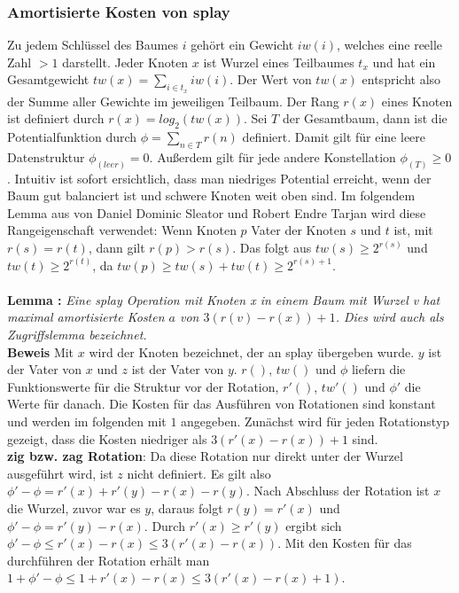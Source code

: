 \documentclass[11pt, a4paper]{article}
\begin{document}
\subsubsection{Amortisierte Kosten von splay }
Zu jedem Schlüssel des Baumes $i$ gehört ein Gewicht $iw(i)$, welches eine reelle Zahl $>1$ darstellt. Jeder Knoten $x$ ist Wurzel eines Teilbaumes $t_x$ und hat ein Gesamtgewicht $tw(x) = \sum \limits_{i \in t_x} iw(i)$. Der Wert von $tw(x)$ entspricht also der Summe aller Gewichte im jeweiligen Teilbaum. Der Rang $r(x)$ eines Knoten ist definiert durch $r(x) = log_2(tw(x))$. Sei $T$ der Gesamtbaum, dann ist die Potentialfunktion durch $\phi = \sum \limits_{n \in T } r(n)$ definiert. Damit gilt für eine leere Datenstruktur $\phi_(leer) = 0$. Außerdem gilt für jede andere Konstellation $\phi_(T) \geq 0$.
Intuitiv ist sofort ersichtlich, dass man niedriges Potential erreicht, wenn der Baum gut balanciert ist und schwere Knoten weit oben sind. 
\noindent Im folgendem Lemma aus \cite{sl2} von Daniel Dominic Sleator und  Robert Endre Tarjan  wird diese Rangeigenschaft verwendet: Wenn Knoten $p$ Vater der Knoten $s$ und $t$ ist, mit $r(s) = r(t)$,  dann gilt $r(p) > r(s)$. Das folgt aus $tw(s) \geq 2^{r(s)}$ und $tw(t) \geq 2^{r(t)}$, da $tw(p) \geq tw(s) + tw(t) \geq 2^{r(s) + 1}$.
\\\\
\noindent\textbf{Lemma \cite{sl2} :} \textit{Eine splay Operation mit Knoten x in einem Baum mit Wurzel v hat maximal  amortisierte Kosten $a$ von $3 (r (v) -r (x)) + 1$. Dies wird auch als Zugriffslemma bezeichnet.}
\\
\noindent\textbf{Beweis} Mit $x$ wird der Knoten bezeichnet, der an splay übergeben wurde. $y$ ist der Vater von $x$ und $z$ ist der Vater von $y$. $r()$, $tw()$ und $\phi$ liefern die Funktionswerte für die Struktur vor der Rotation, $r' ()$, $tw'()$ und $\phi'$ die Werte für danach. Die Kosten für das Ausführen von Rotationen sind konstant und werden im folgenden mit $1$ angegeben.
Zunächst wird für jeden Rotationstyp gezeigt, dass die Kosten niedriger als  $3 (r '(x) -r (x)) + 1$ sind.
\\
\noindent\textbf {zig bzw. zag Rotation}:
Da diese Rotation nur direkt unter der Wurzel ausgeführt wird, ist $z$ nicht definiert.
Es gilt also $\phi' - \phi = r'(x) + r'(y) - r(x) - r(y)$.  
Nach Abschluss der Rotation ist $x$ die Wurzel, zuvor war es $y$, daraus folgt $r(y) = r'(x)$ und  $\phi' - \phi = r'(y) - r(x)$. Durch $r'(x) \geq r'(y)$ ergibt sich $\phi' - \phi \leq r'(x) - r(x) \leq 3 (r '(x) -r (x))$. Mit den Kosten für das durchführen der Rotation erhält man  $1 + \phi' - \phi \leq 1 + r'(x) - r(x) \leq 3 (r '(x) -r (x) + 1)$.
\end{document}
